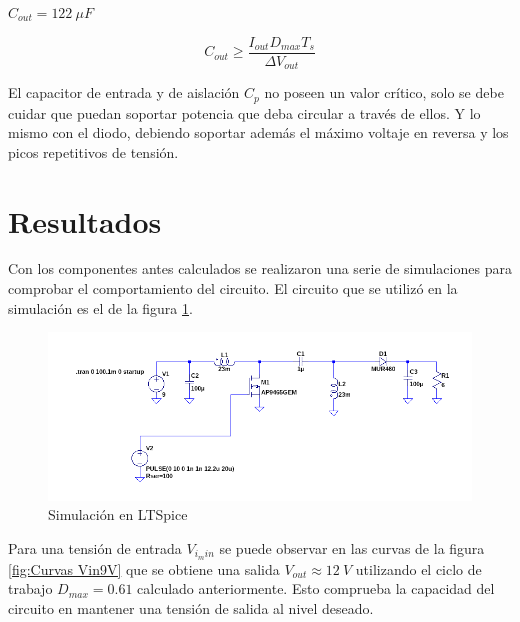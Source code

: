             $C_{out} = 122~\mu F$
            
            \begin{equation}
                C_{out} \geq \frac{I_{out}D_{max}T_s}{\Delta V_{out}}
                \label{ec : Capacitor de salida }
            \end{equation}
        
            El capacitor de entrada y de aislación $C_p$ no poseen un valor crítico, solo se debe cuidar que puedan soportar potencia que deba circular a través de ellos. Y lo mismo con el diodo, debiendo soportar además el máximo voltaje en reversa y los picos repetitivos de tensión.
        
        
        
\section{Resultados}
 
 
    Con los componentes antes calculados se realizaron una serie de simulaciones para comprobar el comportamiento del circuito. El circuito que se utilizó en la simulación es el de la figura \ref{fig: Circuito simulación}. 
    
     \begin{figure}[htbp]
            \centering
             \includegraphics[scale = 0.3]{Figuras/Circuito_simulacion.png}
            \caption{Simulación en LTSpice}
            \label{fig: Circuito simulación}
      \end{figure}
    
    Para una tensión de entrada $V_{i_min}$ se puede observar en las curvas de la figura \ref{fig:Curvas Vin9V}  que se obtiene una salida $V_{out} \approx 12~V$ utilizando el ciclo de trabajo $D_{max} = 0.61$ calculado anteriormente. Esto comprueba la capacidad del circuito en mantener una tensión de salida al nivel deseado. 
    
